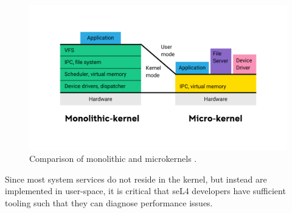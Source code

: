 \begin{figure}[h!]
    \includegraphics[width=\linewidth]{report-a_micro_v_mono}
    \caption{Comparison of monolithic and microkernels \cite{AOSMicrokernelSlide}.}
    \label{fig:sel4_microkernel}
\end{figure}

Since most system services do not reside in the kernel, but instead are implemented in user-space, it is critical that seL4 developers have sufficient tooling such that they can diagnose performance issues.